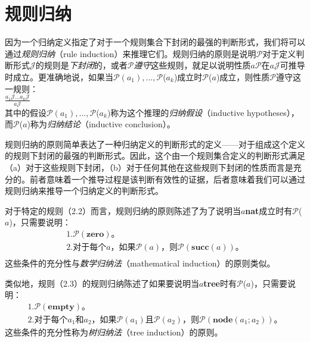 \section{规则归纳}
因为一个归纳定义指定了对于一个规则集合下封闭的最强的判断形式，我们将可以通过\textit{规则归纳}（rule induction）来推理它们。规则归纳的原则是说明$\mathcal{P}$对于定义判断形式$\mathcal{J}$的规则是\textit{下封闭}的，或者$\mathcal{P}$\textit{遵守}这些规则，就足以说明性质$a$$\mathcal{P}$在$a$$\mathcal{J}$可推导时成立。更准确地说，如果当$\mathcal{P}$$(a_{1}),...,$$\mathcal{P}$($a_{k}$)成立时$\mathcal{P}$($a$)成立，则性质$\mathcal{P}$遵守这一规则：\\
$\frac{a_{1}\mathcal{J} ... a_{k}\mathcal{J}}{a\mathcal{J}}$ \\
其中的假设$\mathcal{P}$$(a_{1}),...,$$\mathcal{P}$($a_{k}$)称为这个推理的\textit{归纳假设}（inductive hypotheses），而$\mathcal{P}$($a$)称为\textit{归纳结论}（inductive conclusion）。

规则归纳的原则简单表达了一种归纳定义的判断形式的定义——对于组成这个定义的规则下封闭的最强的判断形式。因此，这个由一个规则集合定义的判断形式满足（a）对于这些规则下封闭，（b）对于任何其他在这些规则下封闭的性质而言是充分的。前者意味着一个推导过程是该判断有效性的证据，后者意味着我们可以通过规则归纳来推导一个归纳定义的判断形式。

对于特定的规则（2.2）而言，规则归纳的原则陈述了为了说明当$a$\textbf{nat}成立时有$\mathcal{P}$($a$)，只需要说明：
\begin{align*}
	1.\mathcal{P}(\textbf{zero})。 \\
	2.\text{对于每个}a，如果\mathcal{P}(a)，则\mathcal{P}(\textbf{succ}(a))。\\
\end{align*}
这些条件的充分性与\textit{数学归纳法}（mathematical induction）的原则类似。

类似地，规则（2.3）的规则归纳陈述了如果要说明当$a$\textbf{tree}时有$\mathcal{P}$($a$)，只需要说明：
\begin{align*}
	1.\mathcal{P}(\textbf{empty})。 \\
	2.对于每个a_{1}和a_{2}，如果\mathcal{P}(a_{1})且\mathcal{P}(a_{2})，则\mathcal{P}(\textbf{node}(a_{1};a_{2}))。
\end{align*}
这些条件的充分性称为\textit{树归纳法}（tree induction）的原则。

